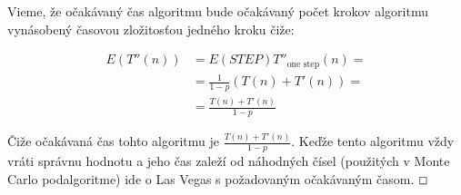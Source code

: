 \documentclass[a4paper]{article}
\begin{document}
Vieme, že očakávaný čas algoritmu bude očakávaný počet krokov algoritmu vynásobený časovou zložitosťou jedného kroku čiže:

\begin{align*}
	E(T''(n)) &= E(STEP)T''_{\text{one step}}(n) =\\
	 &= \frac{1}{1-p}(T(n) + T'(n)) =\\
	 &= \frac{T(n) + T'(n)}{1-p} 
\end{align*}

Čiže očakávaná čas tohto algoritmu je $\frac{T(n) + T'(n)}{1-p}$. Keďže tento algoritmu vždy vráti správnu hodnotu a jeho čas zaleží od náhodných čísel (použitých v Monte Carlo podalgoritme) ide o Las Vegas s požadovaným očakávaným časom. $\oblong$ 
\end{document}
